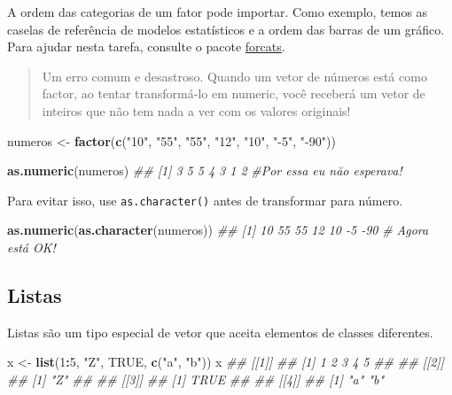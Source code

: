 \documentclass[
]{book}
\newenvironment{Shaded}{\begin{snugshade}}{\end{snugshade}}
\newcommand{\CommentTok}[1]{\textcolor[rgb]{0.56,0.35,0.01}{\textit{#1}}}
\newcommand{\DecValTok}[1]{\textcolor[rgb]{0.00,0.00,0.81}{#1}}
\newcommand{\KeywordTok}[1]{\textcolor[rgb]{0.13,0.29,0.53}{\textbf{#1}}}
\newcommand{\NormalTok}[1]{#1}
\newcommand{\OperatorTok}[1]{\textcolor[rgb]{0.81,0.36,0.00}{\textbf{#1}}}
\newcommand{\OtherTok}[1]{\textcolor[rgb]{0.56,0.35,0.01}{#1}}
\newcommand{\StringTok}[1]{\textcolor[rgb]{0.31,0.60,0.02}{#1}}
\begin{document}
A ordem das categorias de um fator pode importar. Como exemplo, temos as caselas de referência de modelos estatísticos e a ordem das barras de um gráfico. Para ajudar nesta tarefa, consulte o pacote \href{https://github.com/tidyverse/forcats}{forcats}.

\begin{quote}
Um erro comum e desastroso. Quando um vetor de números está como factor, ao tentar transformá-lo em numeric, você receberá um vetor de inteiros que não tem nada a ver com os valores originais!
\end{quote}

\begin{Shaded}
\begin{Highlighting}[]
\NormalTok{numeros <-}\StringTok{ }\KeywordTok{factor}\NormalTok{(}\KeywordTok{c}\NormalTok{(}\StringTok{"10"}\NormalTok{, }\StringTok{"55"}\NormalTok{, }\StringTok{"55"}\NormalTok{, }\StringTok{"12"}\NormalTok{, }\StringTok{"10"}\NormalTok{, }\StringTok{"-5"}\NormalTok{, }\StringTok{"-90"}\NormalTok{))}

\KeywordTok{as.numeric}\NormalTok{(numeros)}
\CommentTok{## [1] 3 5 5 4 3 1 2}
\CommentTok{#Por essa eu năo esperava!}
\end{Highlighting}
\end{Shaded}

Para evitar isso, use \texttt{as.character()} antes de transformar para número.

\begin{Shaded}
\begin{Highlighting}[]
\KeywordTok{as.numeric}\NormalTok{(}\KeywordTok{as.character}\NormalTok{(numeros))}
\CommentTok{## [1]  10  55  55  12  10  -5 -90}
\CommentTok{# Agora está OK!}
\end{Highlighting}
\end{Shaded}

\hypertarget{listas}{%
\subsection{Listas}\label{listas}}

Listas são um tipo especial de vetor que aceita elementos de classes diferentes.

\begin{Shaded}
\begin{Highlighting}[]
\NormalTok{x <-}\StringTok{ }\KeywordTok{list}\NormalTok{(}\DecValTok{1}\OperatorTok{:}\DecValTok{5}\NormalTok{, }\StringTok{"Z"}\NormalTok{, }\OtherTok{TRUE}\NormalTok{, }\KeywordTok{c}\NormalTok{(}\StringTok{"a"}\NormalTok{, }\StringTok{"b"}\NormalTok{))}
\NormalTok{x}
\CommentTok{## [[1]]}
\CommentTok{## [1] 1 2 3 4 5}
\CommentTok{## }
\CommentTok{## [[2]]}
\CommentTok{## [1] "Z"}
\CommentTok{## }
\CommentTok{## [[3]]}
\CommentTok{## [1] TRUE}
\CommentTok{## }
\CommentTok{## [[4]]}
\CommentTok{## [1] "a" "b"}
\end{Highlighting}
\end{Shaded}
\end{document}
